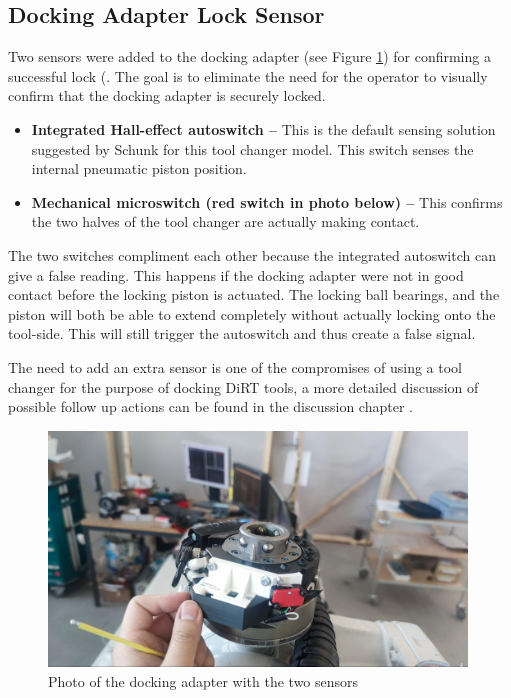 \subsection{Docking Adapter Lock Sensor}
\label{subsection:exploration-4-docking-adapter-lock-sensor}

Two sensors were added to the docking adapter (see Figure \ref{fig:docking-adaptor-with-sensors}) for confirming a successful lock (. The goal is to eliminate the need for the operator to visually confirm that the docking adapter is securely locked.

\begin{itemize}
    \item \textbf{Integrated Hall-effect autoswitch --} This is the default sensing solution suggested by Schunk for this tool changer model. This switch senses the internal pneumatic piston position.
    \item \textbf{Mechanical microswitch (red switch in photo below) --} This confirms the two halves of the tool changer are actually making contact.
\end{itemize}

The two switches compliment each other because the integrated autoswitch can give a false reading. This happens if the docking adapter were not in good contact before the locking piston is actuated. The locking ball bearings, and the piston will both be able to extend completely without actually locking onto the tool-side. This will still trigger the autoswitch and thus create a false signal. 

The need to add an extra sensor is one of the compromises of using a tool changer for the purpose of docking DiRT tools, a more detailed discussion of possible follow up actions can be found in the discussion chapter .

\begin{figure}[!h]
    \centering
    \includegraphics[width=0.99\textwidth]{images/7a/img59.jpg}
    \caption{Photo of the docking adapter with the two sensors}
    \label{fig:docking-adaptor-with-sensors}
\end{figure}

